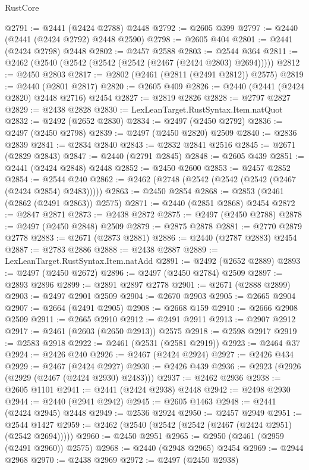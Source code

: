 \begin{lexlean}{RustCore}
\begin{coremodule}
@2791 := @2441 (@2424 @2788) @2448
@2792 := @2605 @399
@2797 := @2440 (@2441 (@2424 @2792) @2448 @2590)
@2798 := @2605 @404
@2801 := @2441 (@2424 @2798) @2448
@2802 := @2457 @2588
@2803 := @2544 @364
@2811 := @2462 (@2540 (@2542 (@2542 (@2542 (@2467 (@2424 @2803) @2694)))))
@2812 := @2450 @2803
@2817 := @2802 (@2461 (@2811 (@2491 @2812)) @2575)
@2819 := @2440 (@2801 @2817)
@2820 := @2605 @409
@2826 := @2440 (@2441 (@2424 @2820) @2448 @2716) @2454
@2827 := @2819 @2826
@2828 := @2797 @2827
@2829 := @2438 @2828
@2830 := LexLeanTarget.RustSyntax.Item.natQuot
@2832 := @2492 (@2652 @2830)
@2834 := @2497 (@2450 @2792)
@2836 := @2497 (@2450 @2798)
@2839 := @2497 (@2450 @2820) @2509
@2840 := @2836 @2839
@2841 := @2834 @2840
@2843 := @2832 @2841 @2516
@2845 := @2671 (@2829 @2843)
@2847 := @2440 (@2791 @2845)
@2848 := @2605 @439
@2851 := @2441 (@2424 @2848) @2448
@2852 := @2450 @2600
@2853 := @2457 @2852
@2854 := @2544 @240
@2862 := @2462 (@2748 (@2542 (@2542 (@2542 (@2467 (@2424 @2854) @2483)))))
@2863 := @2450 @2854
@2868 := @2853 (@2461 (@2862 (@2491 @2863)) @2575)
@2871 := @2440 (@2851 @2868) @2454
@2872 := @2847 @2871
@2873 := @2438 @2872
@2875 := @2497 (@2450 @2788)
@2878 := @2497 (@2450 @2848) @2509
@2879 := @2875 @2878
@2881 := @2770 @2879 @2778
@2883 := @2671 (@2873 @2881)
@2886 := @2440 (@2787 @2883) @2454
@2887 := @2783 @2886
@2888 := @2438 @2887
@2889 := LexLeanTarget.RustSyntax.Item.natAdd
@2891 := @2492 (@2652 @2889)
@2893 := @2497 (@2450 @2672)
@2896 := @2497 (@2450 @2784) @2509
@2897 := @2893 @2896
@2899 := @2891 @2897 @2778
@2901 := @2671 (@2888 @2899)
@2903 := @2497 @2901 @2509
@2904 := @2670 @2903
@2905 := @2665 @2904
@2907 := @2664 (@2491 @2905)
@2908 := @2668 @159
@2910 := @2666 @2908 @2509
@2911 := @2665 @2910
@2912 := @2491 @2911
@2913 := @2907 @2912
@2917 := @2461 (@2603 (@2650 @2913)) @2575
@2918 := @2598 @2917
@2919 := @2583 @2918
@2922 := @2461 (@2531 (@2581 @2919))
@2923 := @2464 @37
@2924 := @2426 @240
@2926 := @2467 (@2424 @2924)
@2927 := @2426 @434
@2929 := @2467 (@2424 @2927)
@2930 := @2426 @439
@2936 := @2923 (@2926 (@2929 (@2467 (@2424 @2930) @2483)))
@2937 := @2462 @2936
@2938 := @2605 @1101
@2941 := @2441 (@2424 @2938) @2448
@2942 := @2498 @2930
@2944 := @2440 (@2941 @2942)
@2945 := @2605 @1463
@2948 := @2441 (@2424 @2945) @2448
@2949 := @2536 @2924
@2950 := @2457 @2949
@2951 := @2544 @1427
@2959 := @2462 (@2540 (@2542 (@2542 (@2467 (@2424 @2951) (@2542 @2694)))))
@2960 := @2450 @2951
@2965 := @2950 (@2461 (@2959 (@2491 @2960)) @2575)
@2968 := @2440 (@2948 @2965) @2454
@2969 := @2944 @2968
@2970 := @2438 @2969
@2972 := @2497 (@2450 @2938)

\end{coremodule}
\end{lexlean}
